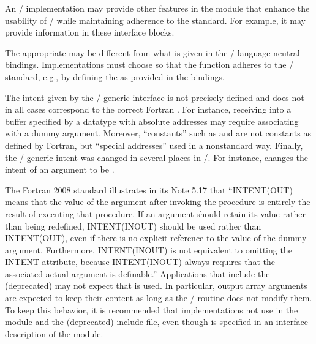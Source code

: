 An \MPI/ implementation may provide other features in the  module
that enhance the usability of \MPI/ while
maintaining adherence to the standard. For example, it
may provide  information in these interface blocks.

\begin{implementors}
The appropriate  may be different from what is given in the
\MPI/ language-neutral bindings.
Implementations must choose  so that
the function adheres to the \MPI/ standard, e.g., by defining the 
as provided in the  bindings.
\end{implementors}

\begin{rationale}
The intent given by the \MPI/ generic interface is not precisely
defined and does not in all cases correspond to the correct Fortran
. For instance, receiving into a buffer specified by a datatype
with absolute addresses may require associating 
with a dummy  argument.  Moreover, ``constants'' such as
 and  are not constants
as defined by Fortran, but ``special addresses'' used in a nonstandard
way.  Finally, the \MPII/ generic intent was changed in several places
in \MPIII/.
For instance,  changes the intent of
an  argument to be .
\end{rationale}

\begin{implementors}
The Fortran 2008 standard illustrates in its Note 5.17 that
``INTENT(OUT) means that the value of the argument
after invoking the procedure is entirely the result
of executing that procedure. If an argument should
retain its value rather than being redefined, INTENT(INOUT)
should be used rather than INTENT(OUT), even if there is
no explicit reference to the value of the dummy argument.
Furthermore,
INTENT(INOUT) is not equivalent to omitting the INTENT attribute,
because INTENT(INOUT) always requires that
the associated actual argument is definable.''
Applications that include the (deprecated)  may not expect
that  is used. In particular, output array
arguments are expected to keep their content as long as the
\MPI/ routine does not modify them.
To keep this behavior, it is recommended that implementations
not use 
in the  module and the (deprecated)  include file,
even though  is specified in
an interface description of the  module.
\end{implementors}

